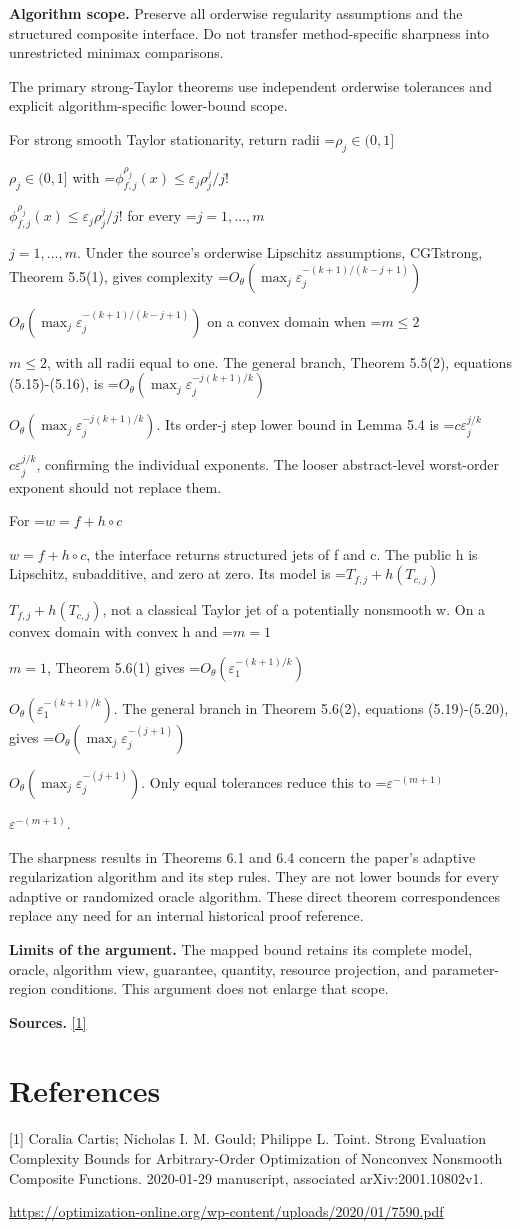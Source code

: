 \documentclass[10pt,a4paper]{article}
\newcommand{\AtlasMath}[1]{\par\begingroup\centering\setbox0=\hbox{$\displaystyle #1$}\ifdim\wd0>1.4\linewidth\typeout{ATLAS WIDE FORMULA: \the\wd0}\fi\ifdim\wd0>\linewidth\resizebox{\linewidth}{!}{\box0}\else\box0\fi\par\endgroup}
\newcommand{\AtlasInlineMath}[1]{\begingroup\setbox0=\hbox{$#1$}\ifdim\wd0>.4\linewidth\endgroup\AtlasMath{#1}\else\endgroup$#1$\fi}
\begin{document}
\textbf{Algorithm scope.} Preserve all orderwise regularity assumptions and the structured composite interface. Do not transfer method-specific sharpness into unrestricted minimax comparisons.

The primary strong-Taylor theorems use independent orderwise tolerances and explicit algorithm-specific lower-bound scope.

For strong smooth Taylor stationarity, return radii \AtlasInlineMath{\rho_j\in(0,1]} with \AtlasInlineMath{\phi_{f,j}^{\rho_j}(x)\le\varepsilon_j\rho_j^j/j!} for every \AtlasInlineMath{j=1,\ldots,m}. Under the source's orderwise Lipschitz assumptions, CGTstrong, Theorem 5.5(1), gives complexity \AtlasInlineMath{O_\theta(\max_j\varepsilon_j^{-(k+1)/(k-j+1)})} on a convex domain when \AtlasInlineMath{m\le2}, with all radii equal to one. The general branch, Theorem 5.5(2), equations (5.15)-(5.16), is \AtlasInlineMath{O_\theta(\max_j\varepsilon_j^{-j(k+1)/k})}. Its order-j step lower bound in Lemma 5.4 is \AtlasInlineMath{c\varepsilon_j^{j/k}}, confirming the individual exponents. The looser abstract-level worst-order exponent should not replace them.

For \AtlasInlineMath{w=f+h\circ c}, the interface returns structured jets of f and c. The public h is Lipschitz, subadditive, and zero at zero. Its model is \AtlasInlineMath{T_{f,j}+h(T_{c,j})}, not a classical Taylor jet of a potentially nonsmooth w. On a convex domain with convex h and \AtlasInlineMath{m=1}, Theorem 5.6(1) gives \AtlasInlineMath{O_{\theta}(\varepsilon_1^{-(k+1)/k})}. The general branch in Theorem 5.6(2), equations (5.19)-(5.20), gives \AtlasInlineMath{O_\theta(\max_j\varepsilon_j^{-(j+1)})}. Only equal tolerances reduce this to \AtlasInlineMath{\varepsilon^{-(m+1)}}.

The sharpness results in Theorems 6.1 and 6.4 concern the paper's adaptive regularization algorithm and its step rules. They are not lower bounds for every adaptive or randomized oracle algorithm. These direct theorem correspondences replace any need for an internal historical proof reference.

\textbf{Limits of the argument.} The mapped bound retains its complete model, oracle, algorithm view, guarantee, quantity, resource projection, and parameter-region conditions. This argument does not enlarge that scope.

\textbf{Sources.} \href{https://optimization-online.org/wp-content/uploads/2020/01/7590.pdf}{[1]}

\section{References}
[1] Coralia Cartis; Nicholas I. M. Gould; Philippe L. Toint. Strong Evaluation Complexity Bounds for Arbitrary-Order Optimization of Nonconvex Nonsmooth Composite Functions. 2020-01-29 manuscript, associated arXiv:2001.10802v1.

\url{https://optimization-online.org/wp-content/uploads/2020/01/7590.pdf}
\end{document}
